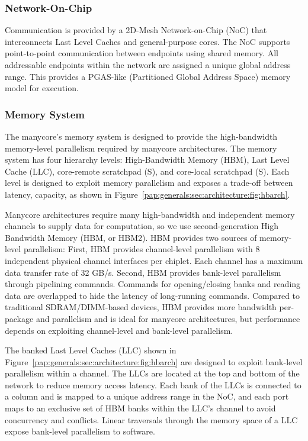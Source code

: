 \manycoreArchFigure

\subsubsection{Network-On-Chip}
Communication is provided by a 2D-Mesh Network-on-Chip (NoC) that
interconnects Last Level Caches and general-purpose cores. The
NoC supports point-to-point communication between endpoints using
shared memory. All addressable endpoints within the network are
assigned a unique global address range. This provides a PGAS-like
(Partitioned Global Address Space) memory model for execution.

\subsubsection{Memory System}
The manycore's memory system is designed to provide the high-bandwidth memory-level parallelism required by manycore
architectures. The memory system has four hierarchy levels:
High-Bandwidth Memory (HBM), Last Level Cache (LLC), core-remote
scratchpad (S), and core-local scratchpad (S). Each level is designed
to exploit memory parallelism and exposes a trade-off between latency,
capacity, as shown in
Figure~\ref{pap:generals:sec:architecture:fig:hbarch}.

Manycore architectures require many high-bandwidth and independent
memory channels to supply data for computation, so we use
second-generation High Bandwidth Memory (HBM, or HBM2). HBM provides
two sources of memory-level parallelism: First, HBM provides
channel-level parallelism with 8 independent physical channel
interfaces per chiplet. Each channel has a maximum data transfer rate of 32
GB/s. Second, HBM provides bank-level parallelism through pipelining
commands. Commands for opening/closing banks and reading data are
overlapped to hide the latency of long-running commands. Compared to
traditional SDRAM/DIMM-based devices, HBM provides more bandwidth
per-package and parallelism and is ideal for manycore
architectures, but performance depends on exploiting channel-level and
bank-level parallelism.

The banked Last Level Caches (LLC) shown in 
Figure~\ref{pap:generals:sec:architecture:fig:hbarch} are designed
to exploit bank-level parallelism within a channel. The LLCs are located at the top and bottom of the network to reduce memory access latency.
Each bank of the LLCs is connected
to a column and is mapped to a unique address range in the NoC, and
each port maps to an exclusive set of HBM banks within the LLC's
channel to avoid concurrency and conflicts. Linear traversals through
the memory space of a LLC expose bank-level parallelism to software.

